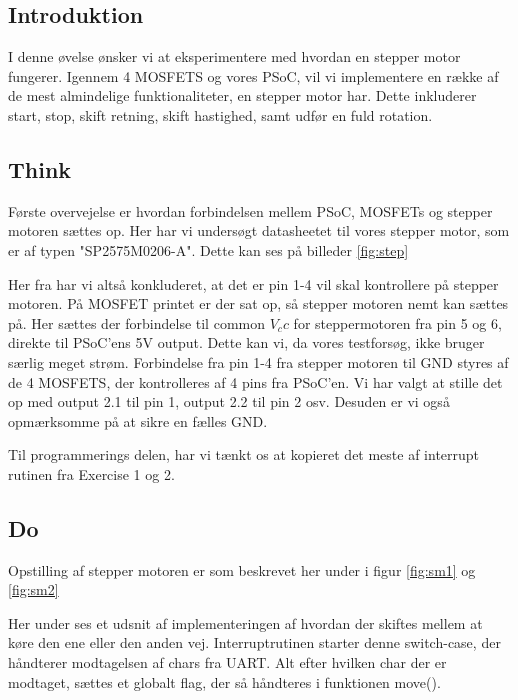 \documentclass[../main.tex]{subfiles}
\begin{document}
\subsection{Introduktion}
I denne øvelse ønsker vi at eksperimentere med hvordan en stepper motor fungerer. Igennem 4 MOSFETS og vores PSoC, vil vi implementere en række af de mest almindelige funktionaliteter, en stepper motor har. Dette inkluderer start, stop, skift retning, skift hastighed, samt udfør en fuld rotation.

\subsection{Think}
Første overvejelse er hvordan forbindelsen mellem PSoC, MOSFETs og stepper motoren sættes op. Her har vi undersøgt datasheetet til vores stepper motor, som er af typen "SP2575M0206-A". Dette kan ses på billeder \ref{fig:step}


Her fra har vi altså konkluderet, at det er pin 1-4 vil skal kontrollere på stepper motoren. På MOSFET printet er der sat op, så stepper motoren nemt kan sættes på. Her sættes der forbindelse til common $V_cc$ for steppermotoren fra pin 5 og 6, direkte til PSoC'ens 5V output. Dette kan vi, da vores testforsøg, ikke bruger særlig meget strøm. Forbindelse fra pin 1-4 fra stepper motoren til GND styres af de 4 MOSFETS, der kontrolleres af 4 pins fra PSoC'en. Vi har valgt at stille det op med output 2.1 til pin 1, output 2.2 til pin 2 osv. Desuden er vi også opmærksomme på at sikre en fælles GND.

Til programmerings delen, har vi tænkt os at kopieret det meste af interrupt rutinen fra Exercise 1 og 2.

\subsection{Do}

Opstilling af stepper motoren er som beskrevet her under i figur \ref{fig:sm1} og \ref{fig:sm2}



Her under ses et udsnit af implementeringen af hvordan der skiftes mellem at køre den ene eller den anden vej. Interruptrutinen starter denne switch-case, der håndterer modtagelsen af chars fra UART. Alt efter hvilken char der er modtaget, sættes et globalt flag, der så håndteres i funktionen move().
\end{document}
